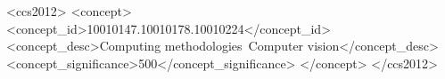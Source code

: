 \documentclass[sigconf, screen, review, anonymous]{acmart}
\begin{document}
\begin{CCSXML}
<ccs2012>
   <concept>
       <concept_id>10010147.10010178.10010224</concept_id>
       <concept_desc>Computing methodologies~Computer vision</concept_desc>
       <concept_significance>500</concept_significance>
       </concept>
 </ccs2012>
\end{CCSXML}






\maketitle
\end{document}
